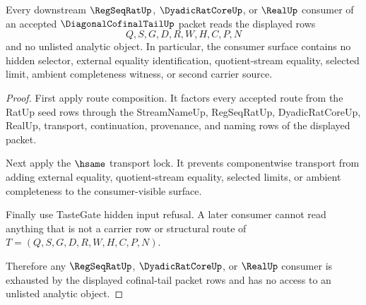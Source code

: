 \begin{theorem}
\label{thm:diagonal-cofinal-tail-consumer-exhaustion}
Every downstream $\RegSeqRatUp$, $\DyadicRatCoreUp$, or $\RealUp$ consumer of an accepted $\DiagonalCofinalTailUp$ packet reads the displayed rows
$$
Q,S,G,D,R,W,H,C,P,N
$$
and no unlisted analytic object. In particular, the consumer surface contains no hidden selector, external equality identification, quotient-stream equality, selected limit, ambient completeness witness, or second carrier source.
\end{theorem}
\begin{proof}
First apply route composition. It factors every accepted route from the RatUp seed rows through the StreamNameUp, RegSeqRatUp, DyadicRatCoreUp, RealUp, transport, continuation, provenance, and naming rows of the displayed packet.

Next apply the $\hsame$ transport lock. It prevents componentwise transport from adding external equality, quotient-stream equality, selected limits, or ambient completeness to the consumer-visible surface.

Finally use TasteGate hidden input refusal. A later consumer cannot read anything that is not a carrier row or structural route of $T=(Q,S,G,D,R,W,H,C,P,N)$.

Therefore any $\RegSeqRatUp$, $\DyadicRatCoreUp$, or $\RealUp$ consumer is exhausted by the displayed cofinal-tail packet rows and has no access to an unlisted analytic object.
\end{proof}

